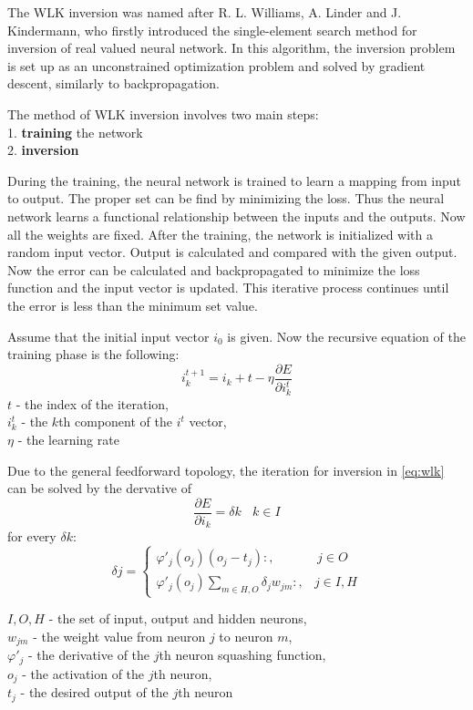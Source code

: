 The WLK inversion was named after R. L. Williams, A. Linder and J.
Kindermann, who firstly introduced the single-element search method for inversion of real valued neural network. In this algorithm, the inversion problem is set up as an unconstrained optimization problem and solved by gradient descent, similarly to backpropagation. \medskip

\noindent The method of WLK inversion involves two main steps: \\
1. \textbf{training} the network \\
2. \textbf{inversion}\medskip

During the training, the neural network is trained to learn a mapping from input to output. The proper set can be find by minimizing the loss. Thus the neural network learns a functional relationship between the inputs and the outputs. Now all the weights are fixed. After the training, the network is initialized with a random input vector. Output is calculated and compared with the given output. Now the error can be calculated and backpropagated to minimize the loss function and the input vector is updated. This iterative process continues until the error is less than the minimum set value.\medskip

Assume that the initial input vector $i_0$ is given. Now the recursive equation of the training phase is the following: 
\begin{equation} i_k^{t+1} = i_k+t - \eta \frac{\partial E}{\partial i_k^t} \label{eq:wlk} \end{equation} 
$t$ - the index of the iteration, \\
$i_k^t$ - the $k$th component of the $i^t$ vector, \\
$\eta$ - the learning rate \medskip

Due to the general feedforward topology, the iteration for inversion in \eqref{eq:wlk} can be solved by the dervative of 
$$ \frac{\partial E}{\partial i_k} = \delta k ~~~~ k \in I$$
for every $\delta k$:
$$ \delta j = \begin{cases} \varphi'_j(o_j)(o_j-t_j):, & ~ j \in O \\ 
\varphi'_j(o_j)\sum_{m\in H,O}\delta_j w_{jm}:, & j \in I, H \end{cases} $$

\noindent $I, O, H$ - the set of input, output and hidden neurons,\\
$w_{jm}$ - the weight value from neuron $j$ to neuron $m$,\\
$\varphi'_j$ - the derivative of the $j$th neuron squashing function,\\
$o_j$ - the activation of the $j$th neuron,\\
$t_j$ - the desired output of the $j$th neuron \medskip

